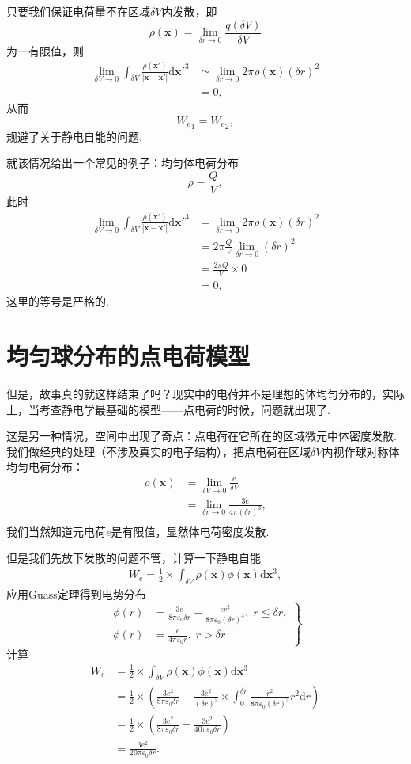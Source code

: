 \documentclass[12pt]{article}
\newcommand{\de}[1]{\mathrm{d}#1}
\newcommand{\mbf}[1]{\mathbf{#1}}
\newcommand{\kh}[1]{\left(#1\right)}
\newcommand{\dkh}[1]{\left.#1\right\}}
\begin{document}
只要我们保证电荷量不在区域\(\delta V\)内发散，即
\[\rho\kh{\mbf x}=\lim_{\delta r \to 0}\frac{q\kh{\delta V}}{\delta V}\]
为一有限值，则
\begin{align*}
    \lim_{\delta V \to 0}\int_{\delta V}\frac{\rho \kh{\mbf x'}}{|\mbf x - \mbf x'|} \de {\mbf x'}^3 &\simeq \lim_{\delta r \to 0} 2\pi \rho\kh{\mbf x}\kh{\delta r}^2\\
    &=0,
\end{align*}
从而
\[{W_e}_1={W_e}_2,\]
规避了关于静电自能的问题.

就该情况给出一个常见的例子：均匀体电荷分布
\[\rho=\frac{Q}{V},\]
此时
\begin{align*}
    \lim_{\delta V \to 0}\int_{\delta V}\frac{\rho \kh{\mbf x'}}{|\mbf x - \mbf x'|} \de {\mbf x'}^3 &= \lim_{\delta r \to 0} 2\pi \rho\kh{\mbf x}\kh{\delta r}^2\\
    &=2\pi \frac{Q}{V}\lim_{\delta r \to 0}\kh{\delta r}^2 \\
    &=\frac{2\pi Q}{V}\times 0\\
    &= 0,
\end{align*}
这里的等号是严格的.
\section{均匀球分布的点电荷模型}
但是，故事真的就这样结束了吗？现实中的电荷并不是理想的体均匀分布的，实际上，当考查静电学最基础的模型——点电荷的时候，问题就出现了.

这是另一种情况，空间中出现了奇点：点电荷在它所在的区域微元中体密度发散. 我们做经典的处理（不涉及真实的电子结构），把点电荷在区域\(\delta V\)内视作球对称体均匀电荷分布：
\begin{align*}
    \rho\kh{\mbf x}&=\lim_{\delta V\to0}\frac{e}{\delta V}\\
    &=\lim_{\delta r\to0}\frac{3e}{4\pi \kh{\delta r}^3},\\
\end{align*}
我们当然知道元电荷\(e\)是有限值，显然体电荷密度发散.

但是我们先放下发散的问题不管，计算一下静电自能
\begin{align*}
    W_e=\frac{1}{2}\times\int_{\delta V}\rho\kh{\mbf x}\phi\kh{\mbf x}\de \mbf x^3,
\end{align*}
应用Guass定理得到电势分布
\[
    \dkh{\begin{align*}\phi\kh{r}&=\frac{3e}{8\pi \varepsilon_0\delta r}-\frac{er^2}{8\pi \varepsilon_0\kh{\delta r}^3},\;r\leq\delta r,\\ \phi\kh
    r&=\frac{e}{4\pi \varepsilon_0r},\;r>\delta r
    \end{align*}}
\]
计算
\begin{align*}
    W_e&=\frac{1}{2}\times\int_{\delta V}\rho\kh{\mbf x}\phi\kh{\mbf x}\de \mbf x^3\\
    &=\frac{1}{2}\times\kh{\frac{3e^2}{8\pi \varepsilon_0\delta r}-\frac{3e^2}{\kh{\delta r}^3}\times\int_0^{\delta r}\frac{r^2}{8\pi \varepsilon_0\kh{\delta r}^3}r^2\de r}\\
    &=\frac{1}{2}\times\kh{\frac{3e^2}{8\pi \varepsilon_0\delta r}-\frac{3e^2}{40\pi \varepsilon_0\delta r}}\\
    &=\frac{3e^2}{20\pi \varepsilon_0\delta r}.
\end{align*}
\end{document}
